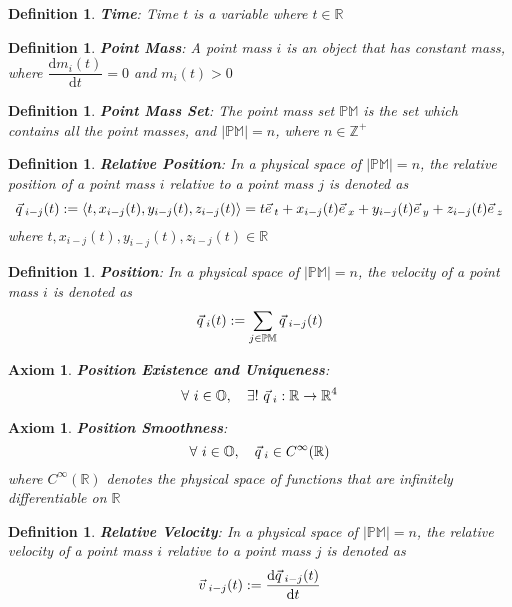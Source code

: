 \documentclass[12pt]{amsart}
\newtheorem{definition}[theorem]{Definition}
\newtheorem{axiom}[theorem]{Axiom}
\let\oldvec\vec
\renewcommand{\vec}[1]{\oldvec{#1}\hspace{0.1em}}
\begin{document}
\begin{definition}
\textbf{Time}: Time $t$ is a variable where $t \in \mathbb{R}$ 
\end{definition}

\begin{definition}
\textbf{Point Mass}: A point mass $i$ is an object that has constant mass, where $\dfrac{\mathrm{d} m_i (t)}{\mathrm{d} t} = 0$ and $m_i (t) > 0$
\end{definition}

\begin{definition}
\textbf{Point Mass Set}: The point mass set $\mathbb{PM}$ is the set which contains all the point masses, and $\left | \mathbb{PM} \right | = n$, where $n \in \mathbb{Z}^{+}$
\end{definition}

\begin{definition}
\textbf{Relative Position}: In a physical space of $\left | \mathbb{PM} \right | = n$, the relative position of a point mass $i$ relative to a point mass $j$ is denoted as
$$\vec{q}_{i-j} (t) := \left< t, x_{i-j}(t), y_{i-j}(t), z_{i-j}(t) \right> = t\vec{e}_t + x_{i-j}(t) \vec{e}_x + y_{i-j}(t) \vec{e}_y + z_{i-j}(t) \vec{e}_z $$
where $t, x_{i-j}(t), y_{i-j}(t), z_{i-j}(t) \in \mathbb{R}$
\end{definition}

\begin{definition}
\textbf{Position}: In a physical space of $\left | \mathbb{PM} \right | = n$, the velocity of a point mass $i$ is denoted as
$$\vec{q}_i(t) :=\displaystyle \sum_{j \in \mathbb{PM}} \vec{q}_{i-j} (t)$$
\end{definition}

\begin{axiom}
\textbf{Position Existence and Uniqueness}: $$\forall \  i \in \mathbb{O}, \quad \exists!\ \vec{q}_i : \mathbb{R} \to \mathbb{R}^4$$
\end{axiom}

\begin{axiom}
\textbf{Position Smoothness}:
$$
\forall \  i \in \mathbb{O}, \quad \vec{q}_i \in C^{\infty}(\mathbb{R})
$$
where $C^{\infty}(\mathbb{R})$ denotes the physical space of functions that are infinitely differentiable on $\mathbb{R}$

\end{axiom}

\begin{definition}
\textbf{Relative Velocity}: In a physical space of $\left | \mathbb{PM} \right | = n$, the relative velocity of a point mass $i$ relative to a point mass $j$ is denoted as
$$\vec{v}_{i-j} (t) := \dfrac{\mathrm{d} \vec{q}_{i-j}(t)}{\mathrm{d} t} $$
\end{definition}
\end{document}
